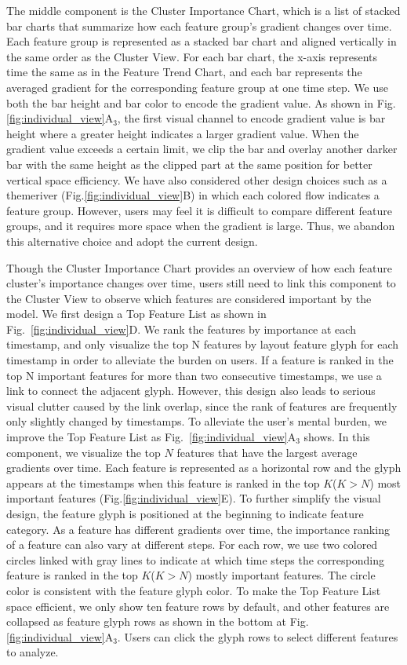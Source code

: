 The middle component is the Cluster Importance Chart, which is a list of stacked bar charts that summarize how each feature group's gradient changes over time.
Each feature group is represented as a stacked bar chart and aligned vertically in the same order as the Cluster View.
For each bar chart, the x-axis represents time the same as in the Feature Trend Chart, and each bar represents the averaged gradient for the corresponding feature group at one time step. 
We use both the bar height and bar color to encode the gradient value.
As shown in  Fig.\ref{fig:individual_view}A$_3$, the first visual channel to encode gradient value is bar height where a greater height indicates a larger gradient value.
When the gradient value exceeds a certain limit, we clip the bar and overlay another darker bar with the same height as the clipped part at the same position for better vertical space efficiency.
We have also considered other design choices such as a themeriver (Fig.\ref{fig:individual_view}B) in which each colored flow indicates a feature group. 
However, users may feel it is difficult to compare different feature groups, and it requires more space when the gradient is large.
Thus, we abandon this alternative choice and adopt the current design.

Though the Cluster Importance Chart provides an overview of how each feature cluster's importance changes over time, users still need to link this component to the Cluster View to observe which features are considered important by the model.
We first design a Top Feature List as shown in Fig.~\ref{fig:individual_view}D. We rank the features by importance at each timestamp, and only visualize the top N features by layout feature glyph for each timestamp in order to alleviate the burden on users. If a feature is ranked in the top N important features for more than two consecutive timestamps, we use a link to connect the adjacent glyph. However, this design also leads to serious visual clutter caused by the link overlap, since the rank of features are frequently only slightly changed by timestamps. 
To alleviate the user's mental burden, we improve the Top Feature List as Fig.~\ref{fig:individual_view}A$_3$ shows.
In this component, we visualize the top $N$ features that have the largest average gradients over time. Each feature is represented as a horizontal row and the glyph appears at the timestamps when this feature is ranked in the top $K$($K>N$) most important features (Fig.\ref{fig:individual_view}E). To further simplify the visual design, the feature glyph is positioned at the beginning to indicate feature category. 
As a feature has different gradients over time, the importance ranking of a feature can also vary at different steps.
For each row, we use two colored circles linked with gray lines to indicate at which time steps the corresponding feature is ranked in the top $K$($K>N$) mostly important features.
The circle color is consistent with the feature glyph color.
To make the Top Feature List space efficient, we only show ten feature rows by default, and other features are collapsed as feature glyph rows as shown in the bottom at Fig.\ref{fig:individual_view}A$_3$.
Users can click the glyph rows to select different features to analyze.


